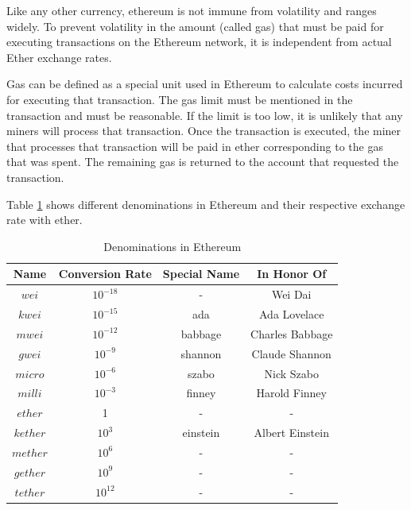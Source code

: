 \documentclass[11pt,openright]{report}
\begin{document}
Like any other currency, ethereum is not immune from volatility and ranges widely. To prevent volatility in the amount (called gas) that must be paid for executing transactions on the Ethereum network, it is independent from actual Ether exchange rates. 

Gas can be defined as a special unit used in Ethereum to calculate costs incurred for executing that transaction. The gas limit must be mentioned in the transaction and must be reasonable. If the limit is too low, it is unlikely that any miners will process that transaction. Once the transaction is executed, the miner that processes that transaction will be paid in ether corresponding to the gas that was spent. The remaining gas is returned to the account that requested the transaction.

Table \ref{eth_denominations} shows different denominations in Ethereum and their respective exchange rate with ether.
\newpage
\hfill\\
\begin{table}[!htbp]
	\renewcommand{\arraystretch}{1.3}
	\caption{Denominations in Ethereum}
	\label{eth_denominations}
	\centering
	\begin{tabular}{|c||c|c|c|}
		\hline
		\bfseries Name & \bfseries Conversion Rate & \bfseries Special Name & \bfseries In Honor Of\\
		\hline\hline
		$wei$ & $10^{-18}$ & - & Wei Dai \\ \hline
	    $kwei$ & $10^{-15}$ & ada & Ada Lovelace \\ \hline
	    $mwei$ & $10^{-12}$ & babbage & Charles Babbage \\ \hline
	    $gwei$ & $10^{-9}$ & shannon & Claude Shannon \\ \hline
	    $micro$ & $10^{-6}$ & szabo & Nick Szabo \\ \hline
	    $milli$ & $10^{-3}$ & finney & Harold Finney \\ \hline
	    $ether$ & 1 & - & - \\ \hline
	    $kether$ & $10^{3}$ & einstein & Albert Einstein \\ \hline
	    $mether$ & $10^{6}$ & - & - \\ \hline
	    $gether$ & $10^{9}$ & - & - \\ \hline
	    $tether$ & $10^{12}$ & - & - \\ \hline
	\end{tabular}
\end{table}
\newline
\newline
\end{document}
